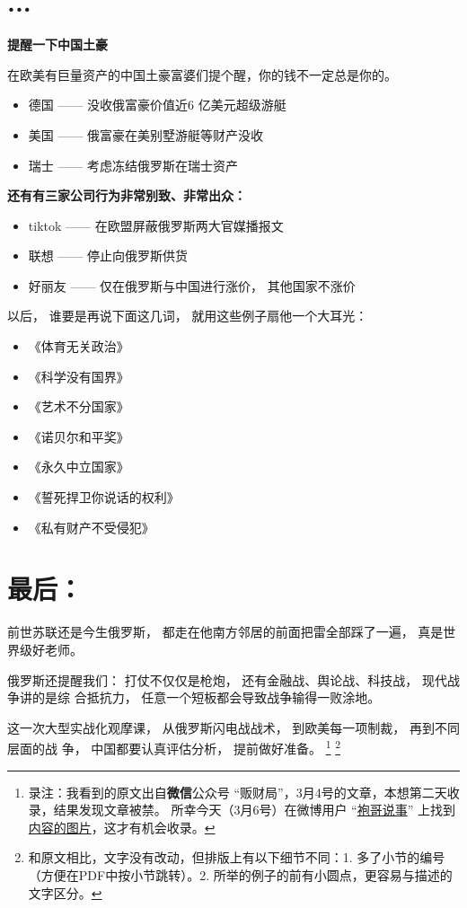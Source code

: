 \documentclass[UTF8, 11pt, oneside]{ctexart}
\begin{document}
\section{...}

\textbf{提醒一下中国土豪}

在欧美有巨量资产的中国土豪富婆们提个醒，你的钱不一定总是你的。

\begin{itemize}
    \item 德国 —— 没收俄富豪价值近6 亿美元超级游艇
    \item 美国 —— 俄富豪在美别墅游艇等财产没收
    \item 瑞士 —— 考虑冻结俄罗斯在瑞士资产
\end{itemize}

\vspace{1em}

\textbf{还有有三家公司行为非常别致、非常出众：}

\begin{itemize}
    \item tiktok  —— 在欧盟屏蔽俄罗斯两大官媒播报文
    \item 联想 —— 停止向俄罗斯供货
    \item 好丽友 —— 仅在俄罗斯与中国进行涨价， 其他国家不涨价
\end{itemize}

\vspace{1em}

以后， 谁要是再说下面这几词， 就用这些例子扇他一个大耳光：

\begin{itemize}
    \item 《体育无关政治》
    \item 《科学没有国界》
    \item 《艺术不分国家》
    \item 《诺贝尔和平奖》
    \item 《永久中立国家》
    \item 《誓死捍卫你说话的权利》
    \item 《私有财产不受侵犯》
\end{itemize}


\section{最后：}

前世苏联还是今生俄罗斯， 都走在他南方邻居的前面把雷全部踩了一遍， 真是世界级好老师。

俄罗斯还提醒我们： 打仗不仅仅是枪炮， 还有金融战、舆论战、科技战， 现代战争讲的是综
合抵抗力， 任意一个短板都会导致战争输得一败涂地。

这一次大型实战化观摩课， 从俄罗斯闪电战战术， 到欧美每一项制裁， 再到不同层面的战
争， 中国都要认真评估分析， 提前做好准备。
\footnote{
    录注：我看到的原文出自\textbf{微信}公众号 “贩财局”，3月4号的文章，本想第二天收录，结果发现文章被禁。
    所幸今天（3月6号）在微博用户 “\href{https://m.weibo.cn/profile/5559135126}{袍哥说事}” 上找到 \href{https://m.weibo.cn/status/4744003536814848}{内容的图片}，这才有机会收录。 }
\footnote{和原文相比，文字没有改动，但排版上有以下细节不同：1. 多了小节的编号（方便在PDF中按小节跳转）。2. 所举的例子的前有小圆点，更容易与描述的文字区分。}
\end{document}
